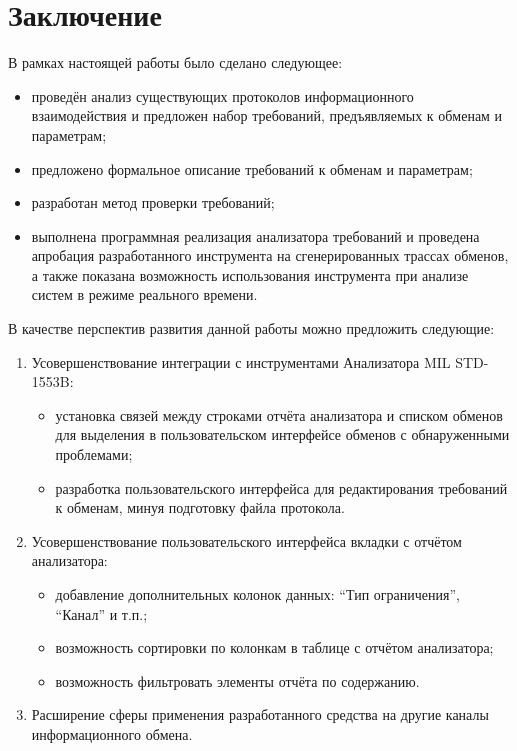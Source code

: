 \section{Заключение}

В рамках настоящей работы было сделано следующее:

\begin{itemize}
 \item проведён анализ существующих протоколов информационного взаимодействия и 
предложен набор требований, предъявляемых к обменам и параметрам;
 \item предложено формальное описание требований к обменам и параметрам;
 \item разработан метод проверки требований;
 \item выполнена программная реализация анализатора требований и 
проведена апробация разработанного инструмента на сгенерированных 
трассах обменов, а также показана возможность использования инструмента при 
анализе систем в режиме реального времени.
\end{itemize}

В качестве перспектив развития данной работы можно предложить следующие:

\begin{enumerate}
 \item Усовершенствование интеграции с  инструментами Анализатора MIL STD-1553B:
 \begin{itemize}
  \item установка связей между строками отчёта анализатора и списком обменов 
для выделения в пользовательском интерфейсе обменов с обнаруженными проблемами;
  \item разработка пользовательского интерфейса для редактирования требований к 
обменам, минуя подготовку файла протокола.
 \end{itemize}
 
 \item Усовершенствование пользовательского интерфейса вкладки с отчётом 
анализатора:
 \begin{itemize}
  \item добавление дополнительных колонок данных: ``Тип ограничения'', 
``Канал'' и т.п.;
  \item возможность сортировки по колонкам в таблице с отчётом анализатора;
  \item возможность фильтровать элементы отчёта по содержанию.
 \end{itemize}

 \item Расширение сферы применения разработанного средства на другие каналы 
информационного обмена.
\end{enumerate}


